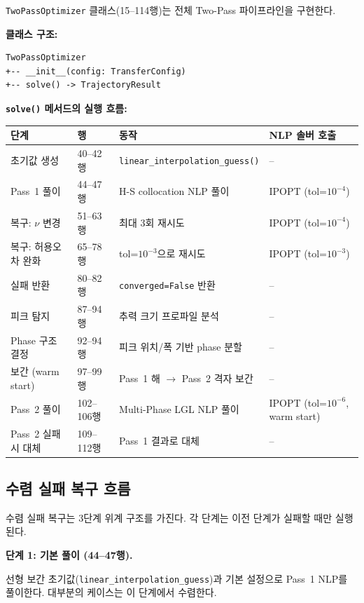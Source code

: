 \documentclass[11pt]{article}
\begin{document}
\texttt{TwoPassOptimizer} 클래스(15--114행)는 전체 Two-Pass 파이프라인을 구현한다.

\textbf{클래스 구조:}

\begin{lstlisting}
TwoPassOptimizer
+-- __init__(config: TransferConfig)
+-- solve() -> TrajectoryResult
\end{lstlisting}

\textbf{\texttt{solve()} 메서드의 실행 흐름:}

\begin{table}[h]
\centering
\small
\begin{tabular}{@{}llll@{}}
\toprule
단계 & 행 & 동작 & NLP 솔버 호출 \\
\midrule
초기값 생성 & 40--42행 & \texttt{linear\_interpolation\_guess()} & -- \\
Pass~1 풀이 & 44--47행 & H-S collocation NLP 풀이 & IPOPT (tol=$10^{-4}$) \\
복구: $\nu$ 변경 & 51--63행 & 최대 3회 재시도 & IPOPT (tol=$10^{-4}$) \\
복구: 허용오차 완화 & 65--78행 & tol=$10^{-3}$으로 재시도 & IPOPT (tol=$10^{-3}$) \\
실패 반환 & 80--82행 & \texttt{converged=False} 반환 & -- \\
피크 탐지 & 87--94행 & 추력 크기 프로파일 분석 & -- \\
Phase 구조 결정 & 92--94행 & 피크 위치/폭 기반 phase 분할 & -- \\
보간 (warm start) & 97--99행 & Pass~1 해 $\to$ Pass~2 격자 보간 & -- \\
Pass~2 풀이 & 102--106행 & Multi-Phase LGL NLP 풀이 & IPOPT (tol=$10^{-6}$, warm start) \\
Pass~2 실패 시 대체 & 109--112행 & Pass~1 결과로 대체 & -- \\
\bottomrule
\end{tabular}
\end{table}

\subsection{수렴 실패 복구 흐름}

수렴 실패 복구는 3단계 위계 구조를 가진다. 각 단계는 이전 단계가 실패할 때만 실행된다.

\textbf{단계 1: 기본 풀이 (44--47행).}

선형 보간 초기값(\texttt{linear\_interpolation\_guess})과 기본 설정으로 Pass~1 NLP를 풀이한다. 대부분의 케이스는 이 단계에서 수렴한다.
\end{document}
